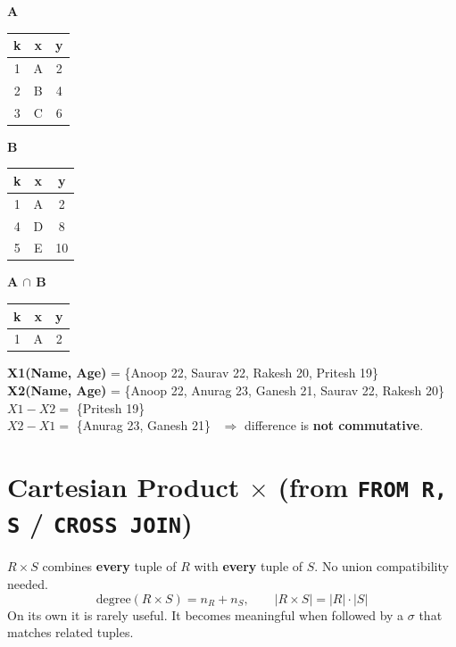 \documentclass[10pt,a4paper]{article}
\begin{document}
\begin{exbox}
\medskip
\begin{minipage}[t]{0.18\linewidth}\centering
\textbf{A}\\[1pt]\begin{tabular}{ccc}\toprule k&x&y\\\midrule 1&A&2\\2&B&4\\3&C&6\\\bottomrule\end{tabular}
\end{minipage}\hfill
\begin{minipage}[t]{0.18\linewidth}\centering
\textbf{B}\\[1pt]\begin{tabular}{ccc}\toprule k&x&y\\\midrule 1&A&2\\4&D&8\\5&E&10\\\bottomrule\end{tabular}
\end{minipage}\hfill
\begin{minipage}[t]{0.16\linewidth}\centering
\textbf{A $\cap$ B}\\[1pt]\begin{tabular}{ccc}\toprule k&x&y\\\midrule 1&A&2\\\bottomrule\end{tabular}
\end{minipage}\hfill
\begin{minipage}[t]{0.4\linewidth}
\textbf{X1(Name, Age)} = \{Anoop 22, Saurav 22, Rakesh 20, Pritesh 19\}\\
\textbf{X2(Name, Age)} = \{Anoop 22, Anurag 23, Ganesh 21, Saurav 22, Rakesh 20\}\\
$X1 - X2 = $ \{Pritesh 19\}\\
$X2 - X1 = $ \{Anurag 23, Ganesh 21\} \ $\Rightarrow$ difference is \textbf{not commutative}.
\end{minipage}
\end{exbox}

\section{Cartesian Product $\times$ (from \texttt{FROM R, S} / \texttt{CROSS JOIN})}

$R \times S$ combines \textbf{every} tuple of $R$ with \textbf{every} tuple of $S$. No union compatibility needed.
\[
\text{degree}(R \times S) = n_R + n_S, \qquad |R \times S| = |R| \cdot |S|
\]
On its own it is rarely useful. It becomes meaningful when followed by a $\sigma$ that matches related tuples.
\end{document}
